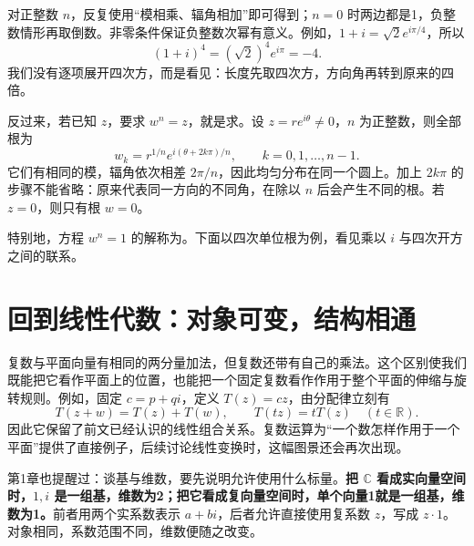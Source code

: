 \documentclass[a4paper,12pt,twoside,openany,fontset=none]{ctexbook}
\numberwithin{equation}{chapter}
\begin{document}
对正整数 $n$，反复使用“模相乘、辐角相加”即可得到；$n=0$ 时两边都是1，负整数情形再取倒数。非零条件保证负整数次幂有意义。例如，$1+i=\sqrt2e^{i\pi/4}$，所以
\[
    (1+i)^4=(\sqrt2)^4e^{i\pi}=-4.
\]
我们没有逐项展开四次方，而是看见：长度先取四次方，方向角再转到原来的四倍。

反过来，若已知 $z$，要求 $w^n=z$，就是求。设 $z=re^{i\theta}\ne0$，$n$ 为正整数，则全部根为
\[
    w_k=r^{1/n}e^{i(\theta+2k\pi)/n},\qquad k=0,1,\ldots,n-1.
\]
它们有相同的模，辐角依次相差 $2\pi/n$，因此均匀分布在同一个圆上。加上 $2k\pi$ 的步骤不能省略：原来代表同一方向的不同角，在除以 $n$ 后会产生不同的根。若 $z=0$，则只有根 $w=0$。

特别地，方程 $w^n=1$ 的解称为。下面以四次单位根为例，看见乘以 $i$ 与四次开方之间的联系。


\clearpage
\section{回到线性代数：对象可变，结构相通}

复数与平面向量有相同的两分量加法，但复数还带有自己的乘法。这个区别使我们既能把它看作平面上的位置，也能把一个固定复数看作作用于整个平面的伸缩与旋转规则。例如，固定 $c=p+qi$，定义 $T(z)=cz$，由分配律立刻有
\[
    T(z+w)=T(z)+T(w),\qquad T(tz)=tT(z)\quad(t\in\mathbb R).
\]
因此它保留了前文已经认识的线性组合关系。复数运算为“一个数怎样作用于一个平面”提供了直接例子，后续讨论线性变换时，这幅图景还会再次出现。

第1章也提醒过：谈基与维数，要先说明允许使用什么标量。\textbf{把 $\mathbb C$ 看成实向量空间时，$1,i$ 是一组基，维数为2；把它看成复向量空间时，单个向量1就是一组基，维数为1。}前者用两个实系数表示 $a+bi$，后者允许直接使用复系数 $z$，写成 $z\cdot1$。对象相同，系数范围不同，维数便随之改变。
\end{document}
